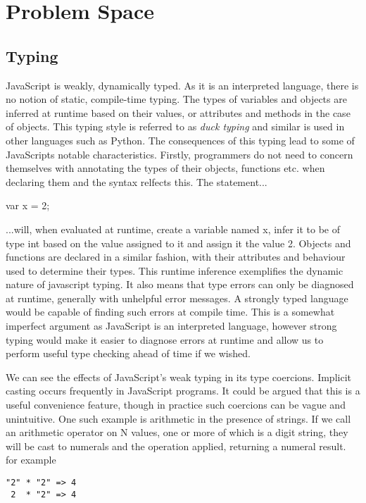 \section{Problem Space}

\subsection{Typing}
JavaScript is weakly, dynamically typed. As it is an interpreted language,
there is no notion of static, compile-time typing. The types of variables
and objects are inferred at runtime based on their values, or attributes and
methods in the case of objects. This typing style is referred to as\emph{
duck typing} and similar is used in other languages such as Python. The
consequences of this typing lead to some of JavaScripts notable characteristics.
Firstly, programmers do not need to concern themselves with annotating the
types of their objects, functions etc. when declaring them and the syntax
relfects this. The statement...
\begin{center}
var x = 2;		
\end{center}
\noindent ...will, when evaluated at runtime, create a variable named x, infer
it to be of type int based on the value assigned to it and assign it the
value 2. Objects and functions are declared in a similar fashion, with their
attributes and behaviour used to determine their types. This runtime inference
exemplifies the dynamic nature of javascript typing. It also means that
type errors can only be diagnosed at runtime, generally with unhelpful 
error messages. A strongly typed language would be capable of finding such
errors at compile time. This is a somewhat imperfect argument as JavaScript
is an interpreted language, however strong typing would make it easier to
diagnose errors at runtime and allow us to perform useful type checking
ahead of time if we wished.

We can see the effects of JavaScript's weak typing in its type coercions. 
Implicit casting occurs frequently in JavaScript programs. It could be argued
that this is a useful convenience feature, though in practice such coercions
can be vague and unintuitive. One such example is arithmetic in the presence
of strings. If we call an arithmetic operator on N values,
one or more of which is a digit string, they will be cast to numerals and
the operation applied, returning a numeral result. for example

\begin{center}
	\verb!"2" * "2" => 4! \\
	\verb! 2  * "2" => 4!
\end{center}

